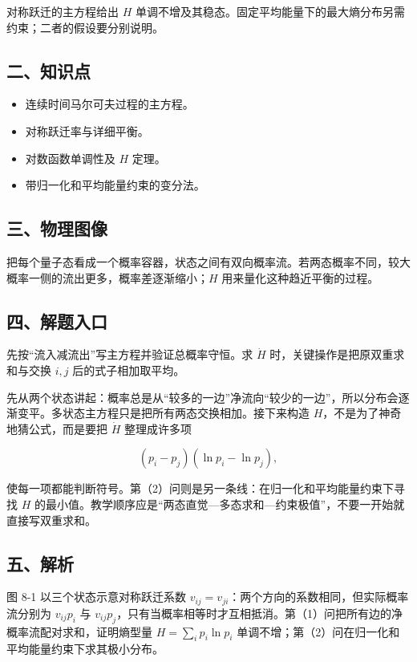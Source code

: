 \documentclass[12pt,a4paper,UTF8]{ctexart}
\newcommand{\tightlist}{\setlength{\itemsep}{0pt}\setlength{\parskip}{0pt}}
\begin{document}
对称跃迁的主方程给出 \(H\)
单调不增及其稳态。固定平均能量下的最大熵分布另需约束；二者的假设要分别说明。

\subsection{二、知识点}\label{ux4e8cux77e5ux8bc6ux70b9-7}

\begin{itemize}
\tightlist
\item
  连续时间马尔可夫过程的主方程。
\item
  对称跃迁率与详细平衡。
\item
  对数函数单调性及 \(H\) 定理。
\item
  带归一化和平均能量约束的变分法。
\end{itemize}

\subsection{三、物理图像}\label{ux4e09ux7269ux7406ux56feux50cf-7}

把每个量子态看成一个概率容器，状态之间有双向概率流。若两态概率不同，较大概率一侧的流出更多，概率差逐渐缩小；\(H\)
用来量化这种趋近平衡的过程。

\subsection{四、解题入口}\label{ux56dbux89e3ux9898ux5165ux53e3-7}

先按``流入减流出''写主方程并验证总概率守恒。求 \(\dot H\)
时，关键操作是把原双重求和与交换 \(i,j\) 后的式子相加取平均。

先从两个状态讲起：概率总是从``较多的一边''净流向``较少的一边''，所以分布会逐渐变平。多状态主方程只是把所有两态交换相加。接下来构造
\(H\)，不是为了神奇地猜公式，而是要把 \(\dot H\) 整理成许多项

\[(p_i-p_j)(\ln p_i-\ln p_j),\]

使每一项都能判断符号。第（2）问则是另一条线：在归一化和平均能量约束下寻找
\(H\)
的最小值。教学顺序应是``两态直觉---多态求和---约束极值''，不要一开始就直接写双重求和。

\subsection{五、解析}\label{ux4e94ux89e3ux6790-7}

图 8-1 以三个状态示意对称跃迁系数
\(v_{ij}=v_{ji}\)：两个方向的系数相同，但实际概率流分别为 \(v_{ij}p_i\)
与
\(v_{ij}p_j\)，只有当概率相等时才互相抵消。第（1）问把所有边的净概率流配对求和，证明熵型量
\(H=\sum_i p_i\ln p_i\)
单调不增；第（2）问在归一化和平均能量约束下求其极小分布。
\end{document}
